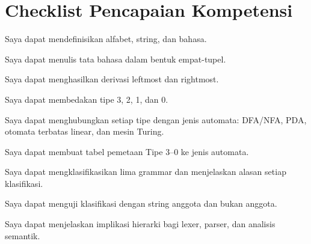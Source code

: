 \section*{Checklist Pencapaian Kompetensi}

\begin{checklist}
  \item Saya dapat mendefinisikan alfabet, string, dan bahasa.
  \item Saya dapat menulis tata bahasa dalam bentuk empat-tupel.
  \item Saya dapat menghasilkan derivasi leftmost dan rightmost.
  \item Saya dapat membedakan tipe 3, 2, 1, dan 0.
  \item Saya dapat menghubungkan setiap tipe dengan jenis automata:
        DFA/NFA, PDA, otomata terbatas linear, dan mesin Turing.
  \item Saya dapat membuat tabel pemetaan Tipe 3--0 ke jenis automata.
  \item Saya dapat mengklasifikasikan lima grammar dan menjelaskan
        alasan setiap klasifikasi.
  \item Saya dapat menguji klasifikasi dengan string anggota dan
        bukan anggota.
  \item Saya dapat menjelaskan implikasi hierarki bagi lexer, parser,
        dan analisis semantik.
\end{checklist}
